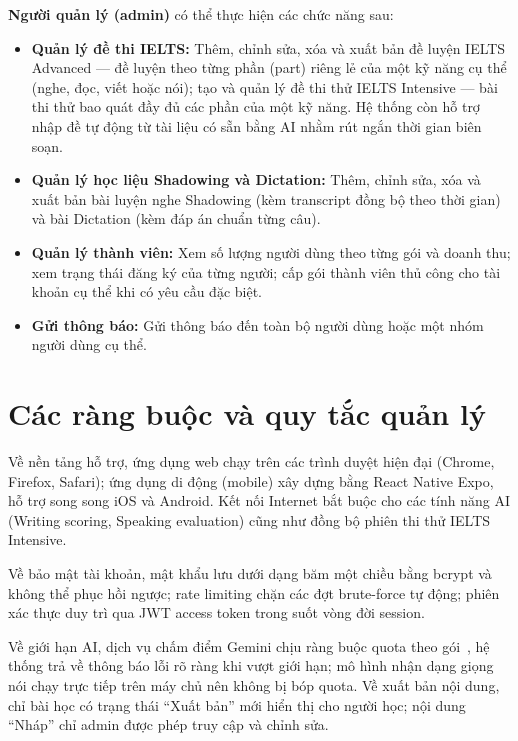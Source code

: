 \textbf{Người quản lý (admin)} có thể thực hiện các chức năng sau:

\begin{itemize}
    \item \textbf{Quản lý đề thi IELTS:} Thêm, chỉnh sửa, xóa và xuất bản đề luyện IELTS Advanced --- đề luyện theo từng phần (part) riêng lẻ của một kỹ năng cụ thể (nghe, đọc, viết hoặc nói); tạo và quản lý đề thi thử IELTS Intensive --- bài thi thử bao quát đầy đủ các phần của một kỹ năng. Hệ thống còn hỗ trợ nhập đề tự động từ tài liệu có sẵn bằng AI nhằm rút ngắn thời gian biên soạn.

    \item \textbf{Quản lý học liệu Shadowing và Dictation:} Thêm, chỉnh sửa, xóa và xuất bản bài luyện nghe Shadowing (kèm transcript đồng bộ theo thời gian) và bài Dictation (kèm đáp án chuẩn từng câu).

    \item \textbf{Quản lý thành viên:} Xem số lượng người dùng theo từng gói và doanh thu; xem trạng thái đăng ký của từng người; cấp gói thành viên thủ công cho tài khoản cụ thể khi có yêu cầu đặc biệt.

    \item \textbf{Gửi thông báo:} Gửi thông báo đến toàn bộ người dùng hoặc một nhóm người dùng cụ thể.
\end{itemize}




\section{Các ràng buộc và quy tắc quản lý}

\begin{sloppypar}
Về nền tảng hỗ trợ, ứng dụng web chạy trên các trình duyệt hiện đại (Chrome, Firefox, Safari); ứng dụng di động (mobile) xây dựng bằng React Native Expo, hỗ trợ song song iOS và Android. Kết nối Internet bắt buộc cho các tính năng AI (Writing scoring, Speaking evaluation) cũng như đồng bộ phiên thi thử IELTS Intensive.
\end{sloppypar}

Về bảo mật tài khoản, mật khẩu lưu dưới dạng băm một chiều bằng bcrypt và không thể phục hồi ngược; rate limiting chặn các đợt brute-force tự động; phiên xác thực duy trì qua JWT access token trong suốt vòng đời session.

Về giới hạn AI, dịch vụ chấm điểm Gemini chịu ràng buộc quota theo gói~\cite{gemini-pricing}, hệ thống trả về thông báo lỗi rõ ràng khi vượt giới hạn; mô hình nhận dạng giọng nói chạy trực tiếp trên máy chủ nên không bị bóp quota. Về xuất bản nội dung, chỉ bài học có trạng thái ``Xuất bản'' mới hiển thị cho người học; nội dung ``Nháp'' chỉ admin được phép truy cập và chỉnh sửa.


